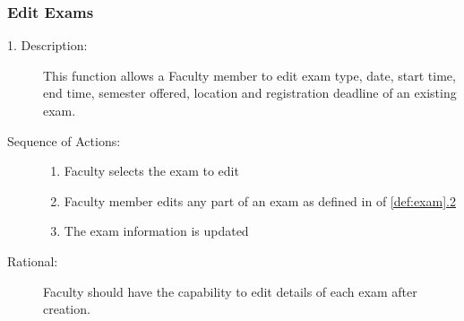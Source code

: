    \subsubsection{\large Edit Exams} 
   \begin{boxed} %
      \begin{description}
         \item[1. Description:\label{desc:edit_exams}]
      This function allows a Faculty member to edit exam type, date, start time,
      end time, semester offered, location and registration deadline of an
      existing exam.
         
            \item[Sequence of Actions:]\hspace{10cm}
         \begin{enumerate}
            \item Faculty selects the exam to edit
            \item Faculty member edits any part of an exam as defined in of
               \autoref{def:exam}\hyperref[def:exam]{.2}
            \item The exam information is updated
         \end{enumerate}

            \item[Rational:]
         Faculty should have the capability to edit details of each exam after
         creation.
      \end{description}
   \end{boxed} %

